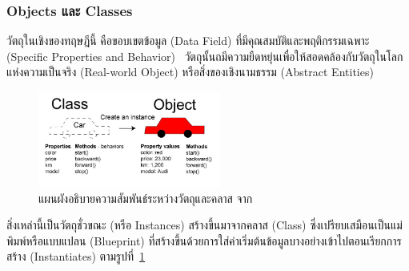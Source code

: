 \documentclass[12pt,one side,openright,a4paper]{cpe-thesis-th}
\newcommand{\thaijustify}[1]{%
  \par\hspace{30pt}\justifying
  #1
}
\begin{document}
        \subsubsection{Objects และ Classes}
            \thaijustify{
            วัตถุในเชิงของทฤษฎีนี้ คือขอบเขตข้อมูล (Data Field) ที่มีคุณสมบัติและพฤติกรรมเฉพาะ (Specific Properties and Behavior)~\cite{apollo22oop} วัตถุนั้นถมีความยืดหยุ่นเพื่อให้สอดคล้องกับวัตถุในโลกแห่งความเป็นจริง (Real-world Object) หรือสิ่งของเชิงนามธรรม (Abstract Entities)
            }
            \begin{figure}[H]
                \centering
                \includegraphics[width=6cm]{figure/literature/oop-class-object.jpg}
                \caption[แผนผังอธิบายความสัมพันธ์ระหว่างวัตถุและคลาส]{แผนผังอธิบายความสัมพันธ์ระหว่างวัตถุและคลาส จาก~\cite{moses22obj}}
                \label{fig:oop-class-obj}
            \end{figure}
            \thaijustify{ 
                สิ่งเหล่านี้เป็นวัตถุชั่วขณะ (หรือ Instances) สร้างขึ้นมาจากคลาส (Class) ซึ่งเปรียบเสมือนเป็นแม่พิมพ์หรือแบบแปลน (Blueprint) ที่สร้างขึ้นด้วยการใส่ค่าเริ่มต้นข้อมูลบางอย่างเข้าไปตอนเรียกการสร้าง (Instantiates) ตามรูปที่~\ref{fig:oop-class-obj}~\cite{apollo22oop}
            }
\end{document}
